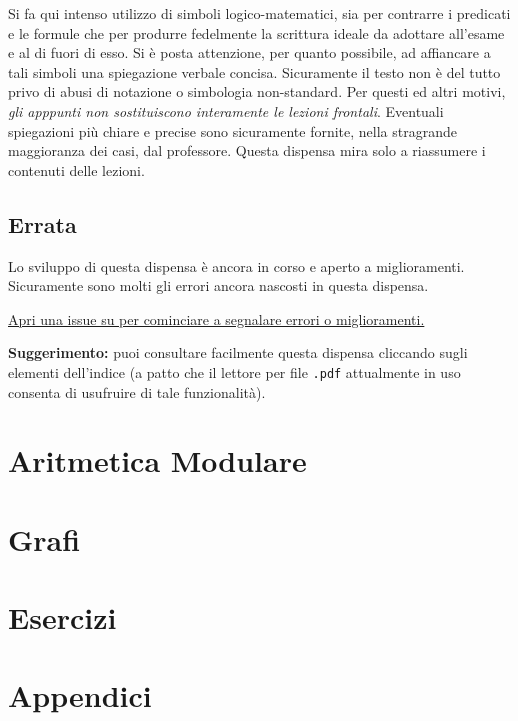\documentclass[oneside]{book}
\begin{document}
Si fa qui intenso utilizzo di simboli logico-matematici, sia per
contrarre i predicati e le formule che per produrre fedelmente la
scrittura ideale da adottare all'esame e al di fuori di esso. Si
è posta attenzione, per quanto possibile, ad affiancare a tali
simboli una spiegazione verbale concisa. Sicuramente il testo non
è del tutto privo di abusi di notazione o simbologia non-standard.
Per questi ed altri motivi, \textit{gli apppunti non sostituiscono
interamente le lezioni frontali}. Eventuali spiegazioni più chiare
e precise sono sicuramente fornite, nella stragrande maggioranza dei
casi, dal professore. Questa dispensa mira solo a riassumere i contenuti
delle lezioni.

\chapter*{Errata}
Lo sviluppo di questa dispensa è ancora in corso e aperto a
miglioramenti. Sicuramente sono molti gli errori ancora nascosti
in questa dispensa.

\begin{center}
    \href{https://github.com/zenosalty/courses-fmi}{Apri una issue su \faGithub \space per cominciare a segnalare errori o miglioramenti.}
\end{center}

\tableofcontents

\vspace*{2cm}
\begin{center}
    \textbf{Suggerimento:} puoi consultare facilmente questa dispensa
    cliccando sugli elementi dell'indice (a patto che il lettore per
    file \texttt{.pdf} attualmente in uso consenta di usufruire di
    tale funzionalità).
\end{center}


\part{Aritmetica Modulare}







\part{Grafi}







\part{Esercizi}





\part{Appendici}


\end{document}
